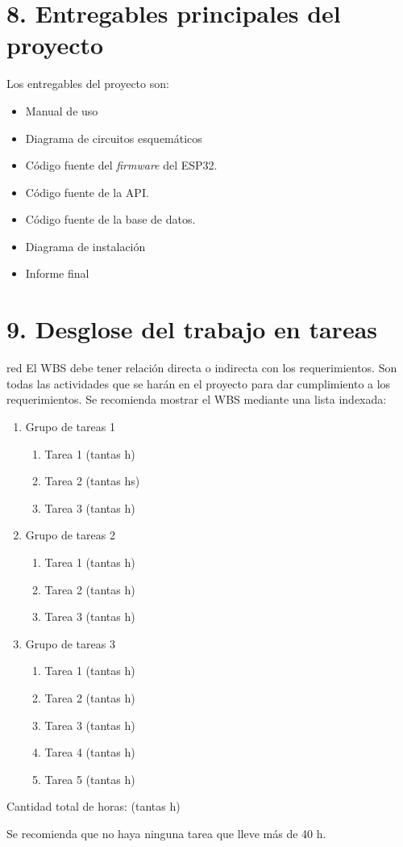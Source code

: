 \documentclass[
11pt, %
codirector, %
]{charter}
\begin{document}
\section{8. Entregables principales del proyecto}
\label{sec:entregables}


Los entregables del proyecto son:

\begin{itemize}
	\item Manual de uso
	\item Diagrama de circuitos esquemáticos
	\item Código fuente del \textit{firmware} del ESP32.
	\item Código fuente de la API.
	\item Código fuente de la base de datos.
	\item Diagrama de instalación
	\item Informe final
\end{itemize}



\section{9. Desglose del trabajo en tareas}
\label{sec:wbs}

\begin{consigna}{red}
El WBS debe tener relación directa o indirecta con los requerimientos.  Son todas las actividades que se harán en el proyecto para dar cumplimiento a los requerimientos. Se recomienda mostrar el WBS mediante una lista indexada:

\begin{enumerate}
\item Grupo de tareas 1
	\begin{enumerate}
	\item Tarea 1 (tantas h)
	\item Tarea 2 (tantas hs)
	\item Tarea 3 (tantas h)
	\end{enumerate}
\item Grupo de tareas 2
	\begin{enumerate}
	\item Tarea 1 (tantas h)
	\item Tarea 2 (tantas h)
	\item Tarea 3 (tantas h)
	\end{enumerate}
\item Grupo de tareas 3
	\begin{enumerate}
	\item Tarea 1 (tantas h)
	\item Tarea 2 (tantas h)
	\item Tarea 3 (tantas h)
	\item Tarea 4 (tantas h)
	\item Tarea 5 (tantas h)
	\end{enumerate}
\end{enumerate}

Cantidad total de horas: (tantas h)

Se recomienda que no haya ninguna tarea que lleve más de 40 h. 

\end{consigna}
\end{document}
